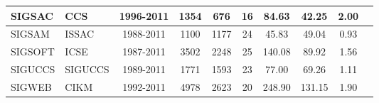 \begin{table*}[!htb]
{\begin{tabular}{|l|l|c|c|c|c|c|c|c|c|}
SIGSAC & CCS & 1996-2011 & 1354 & 676 & 16 & 84.63 & 42.25 & 2.00\\ \hline
SIGSAM & ISSAC & 1988-2011 & 1100 & 1177 & 24 & 45.83 & 49.04 & 0.93\\ \hline
SIGSOFT & ICSE & 1987-2011 & 3502 & 2248 & 25 & 140.08 & 89.92 & 1.56\\ \hline
SIGUCCS & SIGUCCS & 1989-2011 & 1771 & 1593 & 23 & 77.00 & 69.26 & 1.11\\ \hline
SIGWEB & CIKM & 1992-2011 & 4978 & 2623 & 20 & 248.90 & 131.15 & 1.90\\ \hline
\end{tabular}
}
\end{table*}











